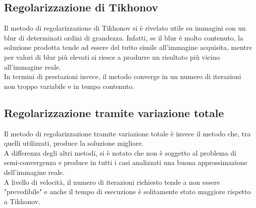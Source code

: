 \documentclass[11pt]{article}
\begin{document}
\subsection{Regolarizzazione di Tikhonov}
Il metodo di regolarizzazione di Tikhonov si è rivelato utile su immagini con un blur di determinati ordini di grandezza. 
Infatti, se il blur è molto contenuto, la soluzione prodotta tende ad essere del tutto simile all'immagine acquisita, mentre per valori di blur più elevati si riesce a produrre un risultato più vicino all'immagine reale.\\
In termini di prestazioni invece, il metodo converge in un numero di iterazioni non troppo variabile e in tempo contenuto.

\subsection{Regolarizzazione tramite variazione totale}
Il metodo di regolarizzazione tramite variazione totale è invece il metodo che, tra quelli utilizzati, produce la soluzione migliore.\\
A differenza degli altri metodi, si è notato che non è soggetto al problema di semi-convergenza e produce in tutti i casi analizzati una buona approssimazione dell'immagine reale.\\
A livello di velocità, il numero di iterazioni richiesto tende a non essere "prevedibile" e anche il tempo di esecuzione è solitamente stato maggiore rispetto a Tikhonov.\\




\newpage
\printbibliography[title={Bibliografia}]
\end{document}
